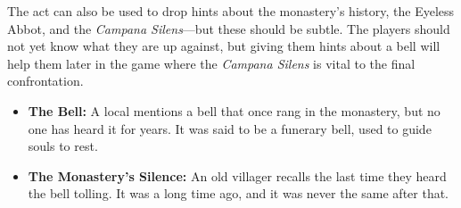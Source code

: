 \documentclass[nodeprecatedcode,bg=print]{dndbook/dndbook}
\begin{document}
The act can also be used to drop hints about the monastery’s history, the Eyeless Abbot, and the \emph{Campana Silens}—but these should be subtle. The players should not yet know what they are up against, but giving them hints about a bell will help them later in the game where the \emph{Campana Silens} is vital to the final confrontation.

\begin{WyrdExample}
    \begin{itemize}
        \item \textbf{The Bell:} A local mentions a bell that once rang in the monastery, but no one has heard it for years. It was said to be a funerary bell, used to guide souls to rest.
        
        \item \textbf{The Monastery’s Silence:} An old villager recalls the last time they heard the bell tolling. It was a long time ago, and it was never the same after that.
    \end{itemize}
\end{WyrdExample}
\end{document}

